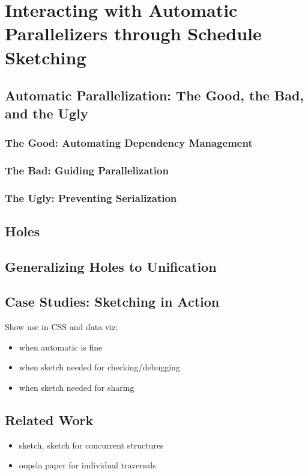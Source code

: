 
\chapter{Interacting with Automatic Parallelizers through Schedule Sketching}

\section{Automatic Parallelization: The Good, the Bad, and the Ugly}

\subsection{The Good: Automating Dependency Management}
\subsection{The Bad: Guiding Parallelization}
\subsection{The Ugly: Preventing Serialization}

\section{Holes}
\section{Generalizing Holes to Unification}

\section{Case Studies: Sketching in Action}
Show use in CSS and data viz: 
\begin{itemize}
\item when automatic is fine
\item when sketch needed for checking/debugging
\item when sketch needed for sharing
\end{itemize}

\section{Related Work}
\begin{itemize}
\item sketch, sketch for concurrent structures
\item oopsla paper for individual traversals
\end{itemize}
